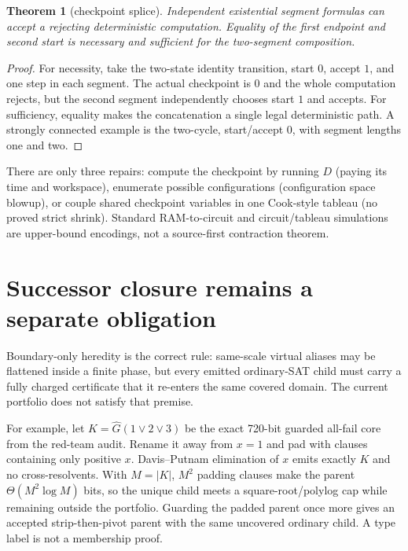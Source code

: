 \documentclass[11pt]{article}
\newtheorem{theorem}{Theorem}
\begin{document}
\begin{theorem}[checkpoint splice]
Independent existential segment formulas can accept a rejecting
deterministic computation.  Equality of the first endpoint and second start
is necessary and sufficient for the two-segment composition.
\end{theorem}
\begin{proof}
For necessity, take the two-state identity transition, start $0$, accept
$1$, and one step in each segment.  The actual checkpoint is $0$ and the
whole computation rejects, but the second segment independently chooses
start $1$ and accepts.  For sufficiency, equality makes the concatenation a
single legal deterministic path.  A strongly connected example is the
two-cycle, start/accept $0$, with segment lengths one and two.
\end{proof}

There are only three repairs: compute the checkpoint by running $D$ (paying
its time and workspace), enumerate possible configurations (configuration
space blowup), or couple shared checkpoint variables in one Cook-style
tableau (no proved strict shrink).  Standard RAM-to-circuit and
circuit/tableau simulations are upper-bound encodings, not a source-first
contraction theorem.

\section{Successor closure remains a separate obligation}
Boundary-only heredity is the correct rule: same-scale virtual aliases may
be flattened inside a finite phase, but every emitted ordinary-SAT child
must carry a fully charged certificate that it re-enters the same covered
domain.  The current portfolio does not satisfy that premise.

For example, let $K=\widehat G(1\vee2\vee3)$ be the exact 720-bit guarded
all-fail core from the red-team audit.  Rename it away from $x=1$ and pad
with clauses containing only positive $x$.  Davis--Putnam elimination of
$x$ emits exactly $K$ and no cross-resolvents.  With $M=|K|$, $M^2$ padding
clauses make the parent $\Theta(M^2\log M)$ bits, so the unique child meets a
square-root/polylog cap while remaining outside the portfolio.  Guarding
the padded parent once more gives an accepted strip-then-pivot parent with
the same uncovered ordinary child.  A type label is not a membership proof.
\end{document}
